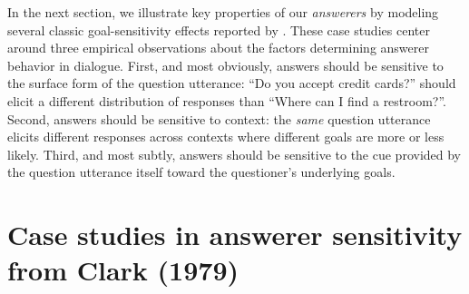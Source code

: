 \documentclass[12pt, floatsintext, jou]{apa6}
\begin{document}
%


In the next section, we illustrate key properties of our \emph{answerers} by modeling several classic goal-sensitivity effects reported by . These case studies center around three empirical observations about the factors determining answerer behavior in dialogue. First, and most obviously, answers should be sensitive to the surface form of the question utterance: ``Do you accept credit cards?'' should elicit a different distribution of responses than ``Where can I find a restroom?''. Second, answers should be sensitive to context: the \emph{same} question utterance elicits different responses across contexts where different goals are more or less likely. Third, and most subtly, answers should be sensitive to the cue provided by the question utterance itself toward the questioner's underlying goals.

\section{Case studies in answerer sensitivity \\ from Clark (1979)}


\end{document}
